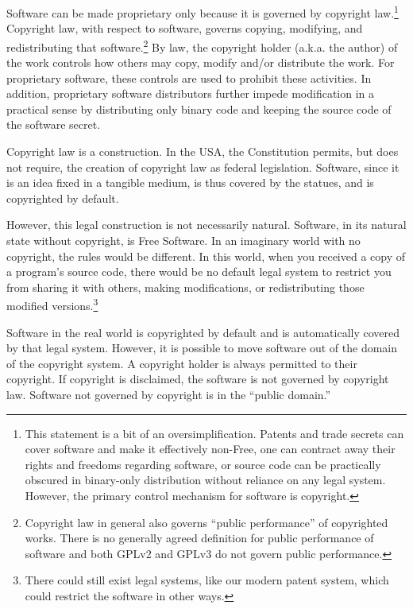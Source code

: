 Software can be made proprietary only because it is governed by copyright
law.\footnote{This statement is a bit of an oversimplification. Patents
  and trade secrets can cover software and make it effectively non-Free,
  one can contract away their rights and freedoms regarding software, or
  source code can be practically obscured in binary-only distribution
  without reliance on any legal system. However, the primary control
  mechanism for software is copyright.} Copyright law, with respect to
software, governs copying, modifying, and redistributing that
software.\footnote{Copyright law in general also governs ``public
  performance'' of copyrighted works. There is no generally agreed
  definition for public performance of software and both GPLv2 and GPLv3
  do not govern public performance.} By law, the copyright holder (a.k.a.
the author) of the work controls how others may copy, modify and/or
distribute the work. For proprietary software, these controls are used to
prohibit these activities. In addition, proprietary software distributors
further impede modification in a practical sense by distributing only
binary code and keeping the source code of the software secret.

Copyright law is a construction. In the USA, the Constitution permits,
but does not require, the creation of copyright law as federal
legislation. Software, since it is an idea fixed in a tangible medium, is
thus covered by the statues, and is copyrighted by default.

However, this legal construction is not necessarily natural. Software, in
its natural state without copyright, is Free Software. In an imaginary
world with no copyright, the rules would be different. In this
world, when you received a copy of a program's source code, there would be
no default legal system to restrict you from sharing it with others,
making modifications, or redistributing those modified
versions.\footnote{There could still exist legal systems, like our modern
  patent system, which could restrict the software in other ways.}

Software in the real world is copyrighted by default and is
automatically covered by that legal system. However, it is possible
to move software out of the domain of the copyright system. A
copyright holder is always permitted to  their
copyright. If copyright is disclaimed, the software is not governed
by copyright law. Software not governed by copyright is in the
``public domain.''

